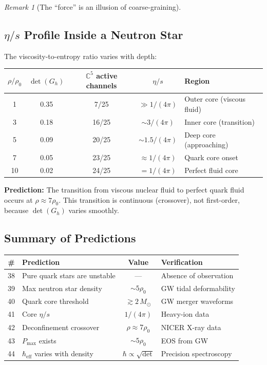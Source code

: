 \documentclass[12pt]{article}
\theoremstyle{remark}
\newtheorem{remark}[theorem]{Remark}
\theoremstyle{definition}
\newcommand{\CC}{\mathbb{C}}
\begin{document}
\begin{remark}[The ``force'' is an illusion of coarse-graining]
\subsection{$\eta/s$ Profile Inside a Neutron Star}

The viscosity-to-entropy ratio varies with depth:

\begin{center}
\begin{tabular}{ccccl}
\hline
$\rho/\rho_0$ & $\det(G_h)$ & $\CC^5$ active channels & $\eta/s$ & Region \\
\hline
1 & 0.35 & 7/25 & $\gg 1/(4\pi)$ & Outer core (viscous fluid) \\
3 & 0.18 & 16/25 & $\sim 3/(4\pi)$ & Inner core (transition) \\
5 & 0.09 & 20/25 & $\sim 1.5/(4\pi)$ & Deep core (approaching) \\
7 & 0.05 & 23/25 & $\approx 1/(4\pi)$ & Quark core onset \\
10 & 0.02 & 24/25 & $= 1/(4\pi)$ & Perfect fluid core \\
\hline
\end{tabular}
\end{center}

\textbf{Prediction:} The transition from viscous nuclear fluid to perfect quark fluid occurs at $\rho \approx 7\rho_0$. This transition is continuous (crossover), not first-order, because $\det(G_h)$ varies smoothly.

\subsection{Summary of Predictions}

\begin{center}
\begin{tabular}{clcl}
\hline
\# & Prediction & Value & Verification \\
\hline
38 & Pure quark stars are unstable & --- & Absence of observation \\
39 & Max neutron star density & $\sim 5\rho_0$ & GW tidal deformability \\
40 & Quark core threshold & $\gtrsim 2\,M_\odot$ & GW merger waveforms \\
41 & Core $\eta/s$ & $1/(4\pi)$ & Heavy-ion data \\
42 & Deconfinement crossover & $\rho \approx 7\rho_0$ & NICER X-ray data \\
43 & $P_\text{max}$ exists & $\sim 5\rho_0$ & EOS from GW \\
44 & $\hbar_\text{eff}$ varies with density & $\hbar \propto \sqrt{\det}$ & Precision spectroscopy \\
\hline
\end{tabular}
\end{center}


\end{remark}
\end{document}
